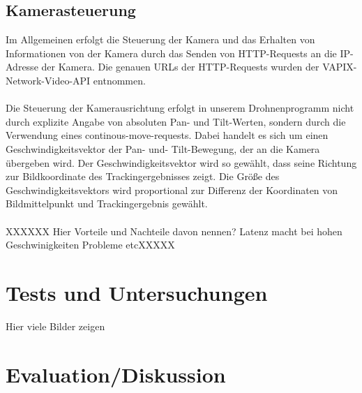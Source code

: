 \documentclass[runningheads]{llncs}
\begin{document}
\subsection{Kamerasteuerung}

Im Allgemeinen erfolgt die Steuerung der Kamera und das Erhalten von Informationen von der Kamera durch das Senden von HTTP-Requests an die IP-Adresse der Kamera. Die genauen URLs der HTTP-Requests wurden der VAPIX-Network-Video-API entnommen.\\\\

Die Steuerung der Kamerausrichtung erfolgt in unserem Drohnenprogramm nicht durch explizite Angabe von absoluten Pan- und Tilt-Werten, sondern durch die Verwendung eines continous-move-requests. Dabei handelt es sich um einen Geschwindigkeitsvektor der Pan- und- Tilt-Bewegung, der an die Kamera übergeben wird. Der Geschwindigkeitsvektor wird so gewählt, dass seine Richtung zur Bildkoordinate des Trackingergebnisses zeigt. Die Größe des Geschwindigkeitsvektors wird proportional zur Differenz der Koordinaten von Bildmittelpunkt und Trackingergebnis gewählt.\\\\

XXXXXX Hier Vorteile und Nachteile davon nennen? Latenz macht bei hohen Geschwinigkeiten Probleme etcXXXXX

\section{Tests und Untersuchungen}

Hier viele Bilder zeigen

\section{Evaluation/Diskussion}
\end{document}
